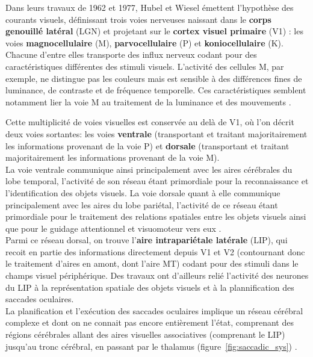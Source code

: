 Dans leurs travaux de 1962 et 1977, Hubel et Wiesel émettent l'hypothèse des courants visuels, définissant trois voies nerveuses naissant dans le \textbf{corps genouillé latéral} (LGN) et projetant sur le \textbf{cortex visuel primaire} (V1) :  les voies \textbf{magnocellulaire} (M),  \textbf{parvocellulaire} (P) et  \textbf{koniocellulaire} (K). Chacune d'entre elles transporte des influx nerveux codant pour des caractéristiques différentes des stimuli visuels.
L'activité des cellules M, par exemple, ne distingue pas les couleurs mais est sensible à des différences fines de luminance, de contraste et de fréquence temporelle. Ces caractéristiques semblent notamment lier la voie M au traitement de la luminance et des mouvements \autocite{Denison2014, Werner2014}.

Cette multiplicité de voies visuelles est conservée au delà de V1, où l'on décrit deux voies sortantes: les voies \textbf{ventrale} (transportant et traitant majoritairement les informations provenant de la voie P) et \textbf{dorsale} (transportant et traitant majoritairement les informations provenant de la voie M)\autocite{Freeman2011, Goodale2004, Werner2014}.\\
La voie ventrale communique ainsi principalement avec les aires cérébrales du lobe temporal, l'activité de son réseau étant primordiale pour la reconnaissance et l'identification des objets visuels. La voie dorsale quant à elle communique principalement avec les aires du lobe pariétal, l'activité de ce réseau étant primordiale pour le traitement des relations spatiales entre les objets visuels ainsi que pour le guidage attentionnel et visuomoteur vers eux \autocite{Freeman2011, Goodale2004, Werner2014}.\\
Parmi ce réseau dorsal, on trouve l'\textbf{aire intrapariétale latérale} (LIP), qui recoit en partie des informations directement depuis V1 et V2 (contournant donc le traitement d'aires en amont, dont l'aire MT) codant pour des stimuli dans le champs visuel périphérique. Des travaux ont d'ailleurs relié l'activité des neurones du LIP à la représentation spatiale des objets visuels et à la plannification des saccades oculaires\autocite{Werner2014}.\\
La planification et l'exécution des saccades oculaires implique un réseau cérébral complexe et dont on ne connait pas encore entièrement l'état, comprenant des régions cérébrales allant des aires visuelles associatives (comprenant le LIP) jusqu'au tronc cérébral, en passant par le thalamus (figure~\ref{fig:saccadic_sys}) \autocite{Zhaoping2014}.

